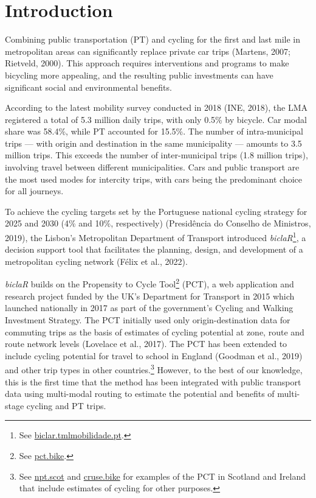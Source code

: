\documentclass[review, doubleblind, 3p,
authoryear]{elsarticle} %
\begin{document}
\hypertarget{introduction}{%
\section{Introduction}\label{introduction}}

Combining public transportation (PT) and cycling for the first and last
mile in metropolitan areas can significantly replace private car trips
(Martens, 2007; Rietveld, 2000). This approach requires interventions
and programs to make bicycling more appealing, and the resulting public
investments can have significant social and environmental benefits.

According to the latest mobility survey conducted in 2018 (INE, 2018),
the LMA registered a total of 5.3 million daily trips, with only 0.5\%
by bicycle. Car modal share was 58.4\%, while PT accounted for 15.5\%.
The number of intra-municipal trips --- with origin and destination in
the same municipality --- amounts to 3.5 million trips. This exceeds the
number of inter-municipal trips (1.8 million trips), involving travel
between different municipalities. Cars and public transport are the most
used modes for intercity trips, with cars being the predominant choice
for all journeys.

To achieve the cycling targets set by the Portuguese national cycling
strategy for 2025 and 2030 (4\% and 10\%, respectively) (Presidência do
Conselho de Ministros, 2019), the Lisbon's Metropolitan Department of
Transport introduced \emph{biclaR}\footnote{See
  \href{https://biclar.tmlmobilidade.pt/}{biclar.tmlmobilidade.pt}.}, a
decision support tool that facilitates the planning, design, and
development of a metropolitan cycling network (Félix et al., 2022).

\emph{biclaR} builds on the Propensity to Cycle Tool\footnote{See
  \href{https://www.pct.bike/}{pct.bike}.} (PCT), a web application and
research project funded by the UK's Department for Transport in 2015
which launched nationally in 2017 as part of the government's Cycling
and Walking Investment Strategy. The PCT initially used only
origin-destination data for commuting trips as the basis of estimates of
cycling potential at zone, route and route network levels (Lovelace et
al., 2017). The PCT has been extended to include cycling potential for
travel to school in England (Goodman et al., 2019) and other trip types
in other countries.\footnote{See \href{https://www.npt.scot}{npt.scot}
  and \href{https://cruse.bike}{cruse.bike} for examples of the PCT in
  Scotland and Ireland that include estimates of cycling for other
  purposes.} However, to the best of our knowledge, this is the first
time that the method has been integrated with public transport data
using multi-modal routing to estimate the potential and benefits of
multi-stage cycling and PT trips.
\end{document}
